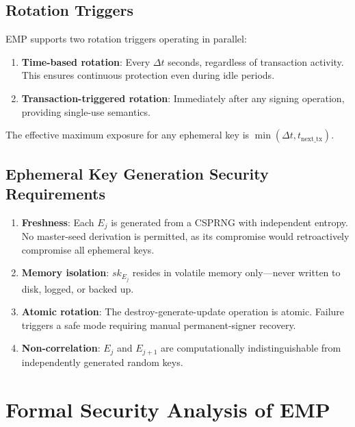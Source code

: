 \documentclass[12pt, a4paper, twocolumn]{article}
\begin{document}
\subsection{Rotation Triggers}

EMP supports two rotation triggers operating in parallel:

\begin{enumerate}[noitemsep]
  \item \textbf{Time-based rotation}: Every $\Delta t$ seconds, regardless of transaction activity. This ensures continuous protection even during idle periods.
  \item \textbf{Transaction-triggered rotation}: Immediately after any signing operation, providing single-use semantics.
\end{enumerate}

The effective maximum exposure for any ephemeral key is $\min(\Delta t, t_{\text{next\_tx}})$.

\subsection{Ephemeral Key Generation Security Requirements}

\begin{enumerate}[noitemsep]
  \item \textbf{Freshness}: Each $E_j$ is generated from a CSPRNG with independent entropy. No master-seed derivation is permitted, as its compromise would retroactively compromise all ephemeral keys.
  \item \textbf{Memory isolation}: $sk_{E_j}$ resides in volatile memory only---never written to disk, logged, or backed up.
  \item \textbf{Atomic rotation}: The destroy-generate-update operation is atomic. Failure triggers a safe mode requiring manual permanent-signer recovery.
  \item \textbf{Non-correlation}: $E_j$ and $E_{j+1}$ are computationally indistinguishable from independently generated random keys.
\end{enumerate}

\section{Formal Security Analysis of EMP}
\label{sec:emp_security}
\end{document}
